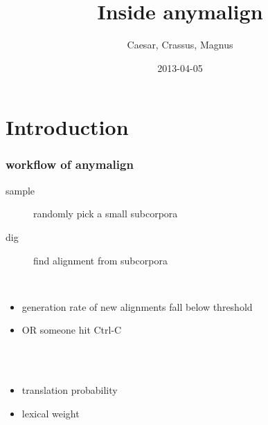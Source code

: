 

\date{2013-04-05} %
\title{Inside anymalign}
\author{Caesar, Crassus, Magnus }



\section{Introduction}{
  \begin{frame}
    \titlepage
  \end{frame}

  \begin{frame}
    \frametitle{workflow of anymalign}
    \begin{algorithmic}
      \Repeat
        \begin{description}
          \item[sample] randomly pick a small subcorpora
          \item[dig]    find alignment from subcorpora
        \end{description}
      \\
      \Until
        \begin{itemize}
          \item generation rate of new alignments fall below threshold
          \item OR someone hit Ctrl-C
        \end{itemize}
      \\\ \\
      \Return
        \begin{itemize}
          \item translation probability
          \item lexical weight
        \end{itemize}
    \end{algorithmic}
  \end{frame}
}

